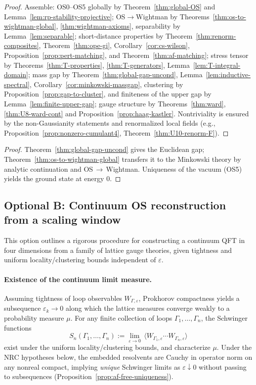 \documentclass[11pt]{amsart}
\theoremstyle{plain}
\theoremstyle{definition}
\theoremstyle{remark}
\begin{document}
\begin{proof}
Assemble: OS0--OS5 globally by Theorem~\ref{thm:global-OS} and Lemma~\ref{lem:rp-stability-projective}; OS$\to$Wightman by Theorems~\ref{thm:os-to-wightman-global}, \ref{thm:wightman-axioms}, separability by Lemma~\ref{lem:separable}; short-distance properties by Theorem~\ref{thm:renorm-composites}, Theorem~\ref{thm:ope-gi}, Corollary~\ref{cor:cs-wilson}, Proposition~\ref{prop:pert-matching}, and Theorem~\ref{thm:af-matching}; stress tensor by Theorems~\ref{thm:T-properties}, \ref{thm:T-generators}, Lemma~\ref{lem:T-integral-domain}; mass gap by Theorem~\ref{thm:global-gap-uncond}, Lemma~\ref{lem:inductive-spectral}, Corollary~\ref{cor:minkowski-massgap}, clustering by Proposition~\ref{prop:gap-to-cluster}, and finiteness of the upper gap by Lemma~\ref{lem:finite-upper-gap}; gauge structure by Theorems~\ref{thm:ward}, \ref{thm:U8-ward-cont} and Proposition~\ref{prop:haag-kastler}. Nontriviality is ensured by the non-Gaussianity statements and renormalized local fields (e.g., Proposition~\ref{prop:nonzero-cumulant4}, Theorem~\ref{thm:U10-renorm-F}).
\end{proof}
\begin{proof}
Theorem~\ref{thm:global-gap-uncond} gives the Euclidean gap; Theorem~\ref{thm:os-to-wightman-global} transfers it to the Minkowski theory by analytic continuation and OS\,$\to$\,Wightman. Uniqueness of the vacuum (OS5) yields the ground state at energy $0$.
\end{proof}

\subsection*{Optional B: Continuum OS reconstruction from a scaling window}

This option outlines a rigorous procedure for constructing a continuum QFT in four dimensions from a family of lattice gauge theories, given tightness and uniform locality/clustering bounds independent of $\varepsilon$.

\paragraph{Existence of the continuum limit measure.}
Assuming tightness of loop observables $W_{\Gamma,\varepsilon}$, Prokhorov compactness yields a subsequence $\varepsilon_k\to 0$ along which the lattice measures converge weakly to a probability measure $\mu$. For any finite collection of loops $\Gamma_1,\dots,\Gamma_n$, the Schwinger functions
\[
  S_n(\Gamma_1,\dots,\Gamma_n):=\lim_{\varepsilon\to 0}\,\langle W_{\Gamma_1,\varepsilon}\cdots W_{\Gamma_n,\varepsilon}\rangle
\]
exist under the uniform locality/clustering bounds, and characterize $\mu$.
Under the NRC hypotheses below, the embedded resolvents are Cauchy in operator norm on any nonreal compact, implying \emph{unique} Schwinger limits as $\varepsilon\downarrow 0$ without passing to subsequences (Proposition~\ref{prop:af-free-uniqueness}).
\end{document}
